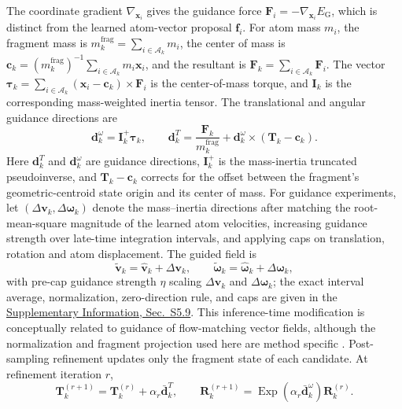 \documentclass{article}
\renewcommand{\boldsymbol}[1]{\pmb{#1}}
\newcommand{\citep}[1]{\cite{#1}}
\newcommand{\sisection}[1]{\href{SI.pdf}{Supplementary Information, Sec.~#1}}
\begin{document}
The coordinate gradient \(\nabla_{\mathbf{x}_i}\) gives the guidance force \(\mathbf{F}_i=-\nabla_{\mathbf{x}_i}E_{\mathrm{G}}\), which is distinct from the learned atom-vector proposal \(\mathbf{f}_i\).
For atom mass \(m_i\), the fragment mass is \(m_k^{\mathrm{frag}}=\sum_{i\in\mathcal{A}_k}m_i\), the center of mass is \(\mathbf{c}_k=(m_k^{\mathrm{frag}})^{-1}\sum_{i\in\mathcal{A}_k}m_i\mathbf{x}_i\), and the resultant is \(\mathbf{F}_k=\sum_{i\in\mathcal{A}_k}\mathbf{F}_i\).
The vector \(\boldsymbol{\tau}_k=\sum_{i\in\mathcal{A}_k}(\mathbf{x}_i-\mathbf{c}_k)\times\mathbf{F}_i\) is the center-of-mass torque, and \(\mathbf{I}_k\) is the corresponding mass-weighted inertia tensor.
The translational and angular guidance directions are
\begin{equation}
    \mathbf{d}^{\omega}_k
    =\mathbf{I}_k^{+}\boldsymbol{\tau}_k,
    \qquad
    \mathbf{d}^{T}_k
    =\frac{\mathbf{F}_k}{m_k^{\mathrm{frag}}}
     +\mathbf{d}^{\omega}_k\times(\mathbf{T}_k-\mathbf{c}_k).
    \label{eq:guidance_projection}
\end{equation}
Here \(\mathbf{d}^{T}_k\) and \(\mathbf{d}^{\omega}_k\) are guidance directions, \(\mathbf{I}_k^+\) is the mass-inertia truncated pseudoinverse, and \(\mathbf{T}_k-\mathbf{c}_k\) corrects for the offset between the fragment's geometric-centroid state origin and its center of mass.
For guidance experiments, let \((\Delta\mathbf v_k,\Delta\boldsymbol\omega_k)\) denote the mass--inertia directions after matching the root-mean-square magnitude of the learned atom velocities, increasing guidance strength over late-time integration intervals, and applying caps on translation, rotation and atom displacement.  The guided field is
\begin{equation}
    \widetilde{\mathbf v}_k
    =\widehat{\mathbf v}_k+\Delta\mathbf v_k,
    \qquad
    \widetilde{\boldsymbol\omega}_k
    =\widehat{\boldsymbol\omega}_k+\Delta\boldsymbol\omega_k,
    \label{eq:guidance_drift}
\end{equation}
with pre-cap guidance strength \(\eta\) scaling \(\Delta\mathbf v_k\) and \(\Delta\boldsymbol\omega_k\); the exact interval average, normalization, zero-direction rule, and caps are given in the \sisection{S5.9}.
This inference-time modification is conceptually related to guidance of flow-matching vector fields, although the normalization and fragment projection used here are method specific \citep{feng2025flowguidance}.
Post-sampling refinement updates only the fragment state of each candidate.  At refinement iteration \(r\),
\begin{equation}
    \mathbf{T}_k^{(r+1)}
    =\mathbf{T}_k^{(r)}+\alpha_r\bar{\mathbf{d}}_k^T,
    \qquad
    \mathbf{R}_k^{(r+1)}
    =\operatorname{Exp}(\alpha_r\bar{\mathbf{d}}_k^\omega)
     \mathbf{R}_k^{(r)}.
    \label{eq:guidance_refinement}
\end{equation}
\end{document}

